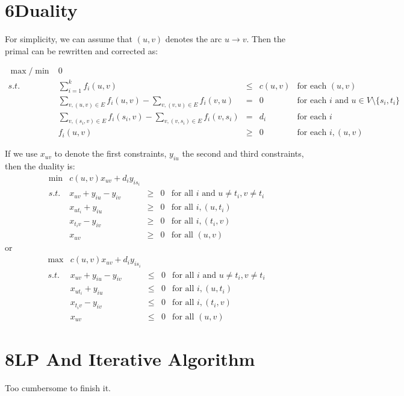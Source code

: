 \documentclass[a4paper,12pt]{article}
\begin{document}
\section*{6\quad Duality}

For simplicity, we can assume that $(u,v)$ denotes the arc $u\rightarrow v$. Then the primal can be rewritten and corrected as:

\[
\begin{array}{rrcll}
 \max/\min & 0 &   \\
 s.t. & \sum_{i=1}^kf_i(u,v) & \leq & c(u,v) & \text{for each $(u,v)$}  \\ \tag{6}
      & \sum_{v,(u,v)\in E}f_i(u,v)-\sum_{v,(v,u)\in E}f_i(v,u) & = & 0 & \text{for each $i$ and $u\in V \setminus \{s_i,t_i\}$}  \\
      & \sum_{v,(s_i,v)\in E}f_i(s_i,v)-\sum_{v,(v,s_i)\in E}f_i(v,s_i) & = & d_i & \text{for each $i$}\\
      & f_i(u,v) & \geq & 0 & \text{for each $i,(u,v)$}
\end{array} \nonumber
\]

If we use $x_{uv}$ to denote the first constraints, $y_{iu}$ the second and third constraints, then the duality is:
\[
\begin{array}{rrcll}
 \min & c(u,v)x_{uv}+d_iy_{is_i} &   \\
 s.t. & x_{uv}+y_{iu}-y_{iv} & \geq & 0 & \text{for all $i$ and $u\neq t_i,v\neq t_i$}  \\ \tag{7}
      & x_{ut_i}+y_{iu} & \geq & 0 & \text{for all $i,(u,t_i)$}  \\
      & x_{t_iv}-y_{iv} & \geq & 0 & \text{for all $i,(t_i,v)$}\\
      & x_{uv} & \geq & 0 & \text{for all $(u,v)$}
\end{array} \nonumber
\]
or
\[
\begin{array}{rrcll}
 \max & c(u,v)x_{uv}+d_iy_{is_i} &   \\
 s.t. & x_{uv}+y_{iu}-y_{iv} & \leq & 0 & \text{for all $i$ and $u\neq t_i,v\neq t_i$}  \\ \tag{8}
      & x_{ut_i}+y_{iu} & \leq & 0 & \text{for all $i,(u,t_i)$}  \\
      & x_{t_iv}-y_{iv} & \leq & 0 & \text{for all $i,(t_i,v)$}\\
      & x_{uv} & \leq & 0 & \text{for all $(u,v)$}
\end{array} \nonumber
\]
\section*{8\quad LP And Iterative Algorithm}
Too cumbersome to finish it.
\end{document}
